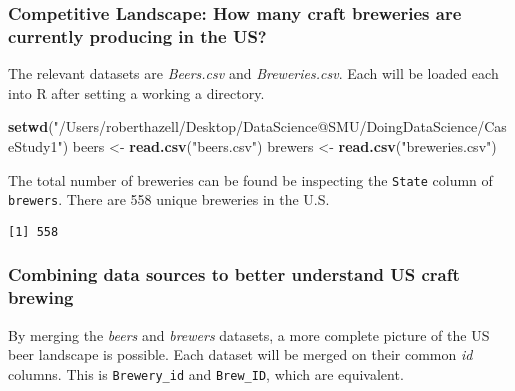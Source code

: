 \documentclass[]{article}
\newenvironment{Shaded}{\begin{snugshade}}{\end{snugshade}}
\newcommand{\KeywordTok}[1]{\textcolor[rgb]{0.13,0.29,0.53}{\textbf{#1}}}
\newcommand{\NormalTok}[1]{#1}
\newcommand{\OperatorTok}[1]{\textcolor[rgb]{0.81,0.36,0.00}{\textbf{#1}}}
\newcommand{\StringTok}[1]{\textcolor[rgb]{0.31,0.60,0.02}{#1}}
\begin{document}
\hypertarget{competitive-landscape-how-many-craft-breweries-are-currently-producing-in-the-us}{%
\subsubsection{Competitive Landscape: How many craft breweries are
currently producing in the
US?}\label{competitive-landscape-how-many-craft-breweries-are-currently-producing-in-the-us}}

The relevant datasets are \emph{Beers.csv} and \emph{Breweries.csv}.
Each will be loaded each into R after setting a working a directory.

\begin{Shaded}
\begin{Highlighting}[]
\KeywordTok{setwd}\NormalTok{(}\StringTok{"/Users/roberthazell/Desktop/DataScience@SMU/DoingDataScience/CaseStudy1"}\NormalTok{)}
\NormalTok{beers <-}\StringTok{ }\KeywordTok{read.csv}\NormalTok{(}\StringTok{"beers.csv"}\NormalTok{)}
\NormalTok{brewers <-}\StringTok{ }\KeywordTok{read.csv}\NormalTok{(}\StringTok{"breweries.csv"}\NormalTok{)}
\end{Highlighting}
\end{Shaded}

The total number of breweries can be found be inspecting the
\texttt{State} column of \texttt{brewers}. There are 558 unique
breweries in the U.S.

\begin{Shaded}
\end{Shaded}

\begin{verbatim}
[1] 558
\end{verbatim}

\hypertarget{combining-data-sources-to-better-understand-us-craft-brewing}{%
\subsubsection{Combining data sources to better understand US craft
brewing}\label{combining-data-sources-to-better-understand-us-craft-brewing}}

By merging the \emph{beers} and \emph{brewers} datasets, a more complete
picture of the US beer landscape is possible. Each dataset will be
merged on their common \emph{id} columns. This is \texttt{Brewery\_id}
and \texttt{Brew\_ID}, which are equivalent.
\end{document}

